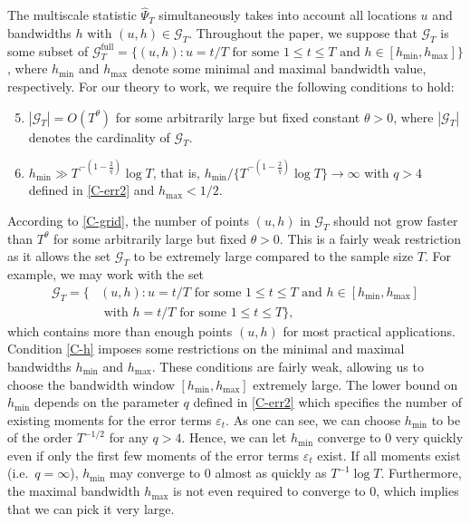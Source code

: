 The multiscale statistic $\widehat{\Psi}_T$ simultaneously takes into account all locations $u$ and bandwidths $h$ with $(u,h) \in \mathcal{G}_T$. Throughout the paper, we suppose that $\mathcal{G}_T$ is some subset of $\mathcal{G}_T^{\text{full}} = \{ (u,h): u = t/T \text{ for some } 1 \le t \le T \text{ and } h \in [h_{\min},h_{\max}] \}$, where $h_{\min}$ and $h_{\max}$ denote some minimal and maximal bandwidth value, respectively. For our theory to work, we require the following conditions to hold:
\begin{enumerate}[label=(C\arabic*),leftmargin=1.05cm]
\setcounter{enumi}{4}

\item \label{C-grid} $|\mathcal{G}_T| = O(T^\theta)$ for some arbitrarily large but fixed constant $\theta > 0$, where $|\mathcal{G}_T|$ denotes the cardinality of $\mathcal{G}_T$. 

\item \label{C-h} $h_{\min} \gg T^{-(1-\frac{2}{q})} \log T$, that is, $h_{\min} / \{ T^{-(1-\frac{2}{q})} \log T \} \rightarrow \infty$ with $q > 4$ defined in \ref{C-err2} and $h_{\max} < 1/2$.

\end{enumerate}
According to \ref{C-grid}, the number of points $(u,h)$ in $\mathcal{G}_T$ should not grow faster than $T^\theta$ for some arbitrarily large but fixed $\theta > 0$. This is a fairly weak restriction as it allows the set $\mathcal{G}_T$ to be extremely large compared to the sample size $T$. For example, we may work with the set 
\begin{align*}
\mathcal{G}_T = \big\{ & (u,h): u = t/T \text{ for some } 1 \le t \le T \text{ and } h \in [h_{\min},h_{\max}] \\ & \text{ with } h = t/T \text{ for some } 1 \le t \le T  \big\},
\end{align*}
which contains more than enough points $(u,h)$ for most practical applications. Condition \ref{C-h} imposes some restrictions on the minimal and maximal bandwidths $h_{\min}$ and $h_{\max}$. These conditions are fairly weak, allowing us to choose the bandwidth window $[h_{\min},h_{\max}]$ extremely large. The lower bound on $h_{\min}$ depends on the parameter $q$ defined in \ref{C-err2} which specifies the number of existing moments for the error terms $\varepsilon_t$. As one can see, we can choose $h_{\min}$ to be of the order $T^{-1/2}$ for any $q > 4$. Hence, we can let $h_{\min}$ converge to $0$ very quickly even if only the first few moments of the error terms $\varepsilon_t$ exist. If all moments exist (i.e.\ $q = \infty$), $h_{\min}$ may converge to $0$ almost as quickly as $T^{-1} \log T$. Furthermore, the maximal bandwidth $h_{\max}$ is not even required to converge to $0$, which implies that we can pick it very large.


